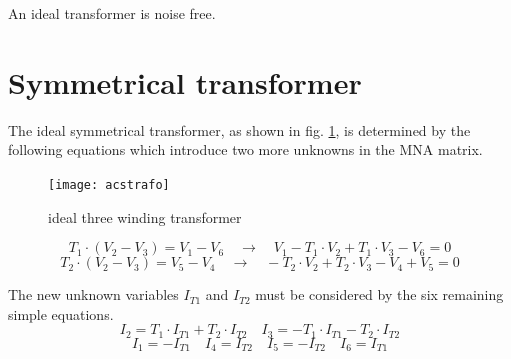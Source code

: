 An ideal transformer is noise free.


\section{Symmetrical transformer}

The ideal symmetrical transformer, as shown in fig.
\ref{fig:strafo}, is determined by the following equations which
introduce two more unknowns in the MNA matrix.

\begin{figure}[ht]
\begin{center}
\texttt{[image: acstrafo]}
\end{center}
\caption{ideal three winding transformer}
\label{fig:strafo}
\end{figure}
\FloatBarrier

\begin{equation}
T_{1}\cdot\left(V_{2} - V_{3}\right) = V_{1} - V_{6}
\quad \rightarrow \quad
V_{1} - T_{1}\cdot V_{2} + T_{1}\cdot V_{3} - V_{6} = 0
\end{equation}
\begin{equation}
T_{2}\cdot\left(V_{2} - V_{3}\right) = V_{5} - V_{4}
\quad \rightarrow \quad
- T_{2}\cdot V_{2} + T_{2}\cdot V_{3} - V_{4} + V_{5} = 0
\label{eq:acstrafo}
\end{equation}

The new unknown variables $I_{T1}$ and $I_{T2}$ must be considered by
the six remaining simple equations.
\begin{equation}
I_{2} = T_{1}\cdot I_{T1} + T_{2}\cdot I_{T2} \quad I_{3} = -T_{1}\cdot I_{T1} - T_{2}\cdot I_{T2}
\end{equation}
\begin{equation}
I_{1} = -I_{T1} \quad I_{4} = I_{T2} \quad I_{5} = -I_{T2} \quad I_{6} = I_{T1}
\end{equation}

